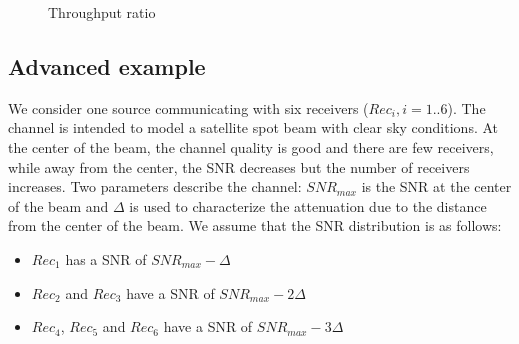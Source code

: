 \documentclass[conference, letterpaper]{IEEEtran}
\begin{document}
\begin{figure}[!ht]
\centering
{}\hfil
{}

\hfil
{}

\hfil
{}

\caption{Throughput ratio}
\label{gain2D}
\end{figure} 


\subsection{Advanced example}

We consider one source communicating with six receivers ($Rec_i, i=1..6$). The channel is intended to model a satellite spot beam with clear sky conditions. At the center of the beam, the channel quality is good and there are few receivers, while away from the center, the SNR decreases but the number of receivers increases. Two parameters describe the channel: $SNR_{max}$ is the SNR at the center of the beam and $\Delta$ is used to characterize the attenuation due to the distance from the center of the beam. We assume that the SNR distribution is as follows:   
\begin{itemize}
\item $Rec_1$ has a SNR of $SNR_{max}-\Delta$
\item $Rec_2$ and $Rec_3$ have a SNR of $SNR_{max}-2\Delta$
\item $Rec_4$, $Rec_5$ and $Rec_6$ have a SNR of $SNR_{max}-3\Delta$
\end{itemize}
\end{document}
